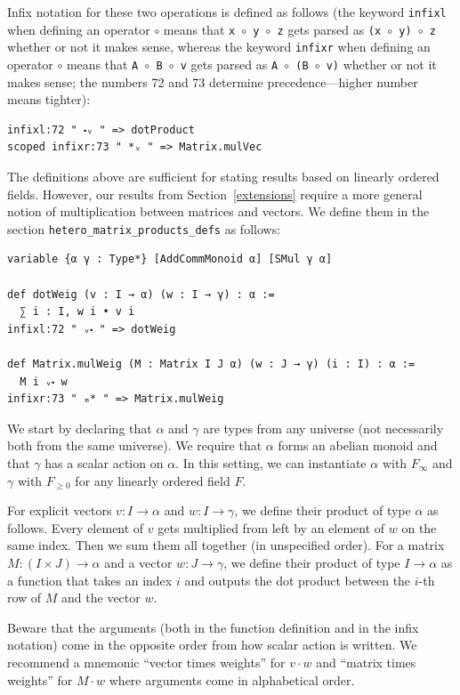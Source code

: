 \documentclass[]{article}
\renewcommand{\.}{\hskip .75pt}
\newcommand{\sekt}[1]{Section~\ref{#1}}
\let\r=\rightarrow
\let\*=\cdot
\begin{document}
Infix notation for these two operations is defined as follows
(the keyword \texttt{infixl} when defining an operator $\circ$ means that
\hbox{\texttt{x $\circ$ y $\circ$ z}} gets parsed as \texttt{(x $\circ$ y) $\circ$ z}
whether or not it makes sense, whereas the keyword \texttt{infixr} when defining an operator $\circ$ means that %
\hbox{\texttt{A $\circ$ B $\circ$ v}} gets parsed as \texttt{A $\circ$ (B $\circ$ v)}
whether or not it makes sense; the numbers 72 and 73 determine precedence\:---\:higher number means tighter):
\begin{lstlisting}
infixl:72 " ⬝ᵥ " => dotProduct
scoped infixr:73 " *ᵥ " => Matrix.mulVec
\end{lstlisting}
The definitions above are sufficient for stating results based on linearly ordered fields.
However, our results from \sekt{extensions} require a more general notion of
multiplication between matrices and vectors.
We define them in the section \texttt{hetero\_matrix\_products\_defs}
as follows:
\begin{lstlisting}
variable {α γ : Type*} [AddCommMonoid α] [SMul γ α]

def dotWeig (v : I → α) (w : I → γ) : α :=
  ∑ i : I, w i • v i
infixl:72 " ᵥ⬝ " => dotWeig

def Matrix.mulWeig (M : Matrix I J α) (w : J → γ) (i : I) : α :=
  M i ᵥ⬝ w
infixr:73 " ₘ* " => Matrix.mulWeig
\end{lstlisting}
We start by declaring that $\alpha$ and $\gamma$ are types from
any universe (not necessarily both from the same universe).
We require that $\alpha$ forms an abelian monoid and that
$\gamma$ has a scalar action on $\alpha$. In this setting,
we can instantiate $\alpha$ with $F_\infty$ and $\gamma$
with $F_{\ge 0}$ for any linearly ordered field $F$.

For explicit vectors
$v : I \r \alpha$ and $w : I \r \gamma$, we define
their product of type $\alpha$ as follows.
Every element of $v$ gets multiplied from left by
an element of $w$ on the same index.
Then we sum them all together (in unspecified order).
For a matrix $M : (I \times J) \r \alpha$ and
a vector $w : J \r \gamma$, we define
their product of type $I \r \alpha$ as a function
that takes an index $i$ and outputs the dot product
between the $i$-th row of $M$ and the vector $w$.

Beware that the arguments (both in the function definition and
in the infix notation) come in the opposite order from how
scalar action is written. We recommend a mnemonic 
``vector times weights'' for $v \* w$ and
``matrix times weights'' for $M \* w$ where
arguments come in alphabetical order.
\end{document}
